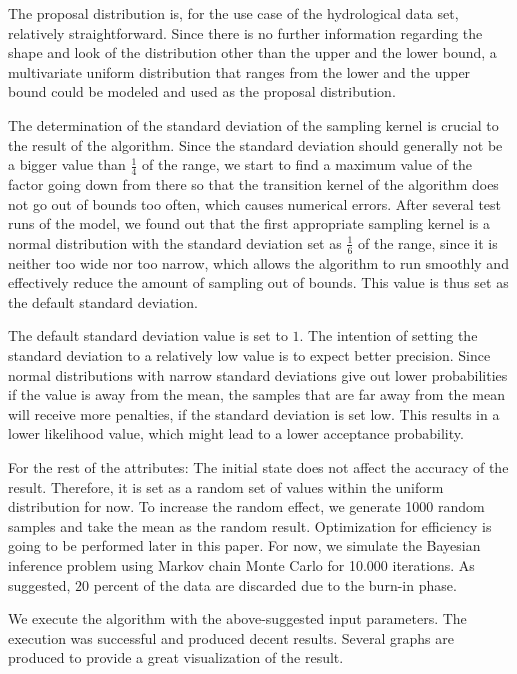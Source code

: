 The proposal distribution is, for the use case of the hydrological data set, relatively straightforward. Since there is no further information regarding the shape and look of the distribution other than the upper and the lower bound, a multivariate uniform distribution that ranges from the lower and the upper bound could be modeled and used as the proposal distribution.

The determination of the standard deviation of the sampling kernel is crucial to the result of the algorithm. Since the standard deviation should generally not be a bigger value than $\frac 1 4$ of the range,\cite{good_standard_deviation} we start to find a maximum value of the factor going down from there so that the transition kernel of the algorithm does not go out of bounds too often, which causes numerical errors. After several test runs of the model, we found out that the first appropriate sampling kernel is a normal distribution with the standard deviation set as $\frac 1 6$ of the range, since it is neither too wide nor too narrow, which allows the algorithm to run smoothly and effectively reduce the amount of sampling out of bounds. This value is thus set as the default standard deviation.

The default standard deviation value is set to $1$. The intention of setting the standard deviation to a relatively low value is to expect better precision. Since normal distributions with narrow standard deviations give out lower probabilities if the value is away from the mean, the samples that are far away from the mean will receive more penalties, if the standard deviation is set low. This results in a lower likelihood value, which might lead to a lower acceptance probability.

For the rest of the attributes: The initial state does not affect the accuracy of the result\cite{mcmc_practice}. Therefore, it is set as a random set of values within the uniform distribution for now. To increase the random effect, we generate 1000 random samples and take the mean as the random result. Optimization for efficiency is going to be performed later in this paper. For now, we simulate the Bayesian inference problem using Markov chain Monte Carlo for 10.000 iterations. As suggested, $20$ percent of the data are discarded due to the burn-in phase.\cite{20per_burnin}


We execute the algorithm with the above-suggested input parameters. The execution was successful and produced decent results. Several graphs are produced to provide a great visualization of the result. 

